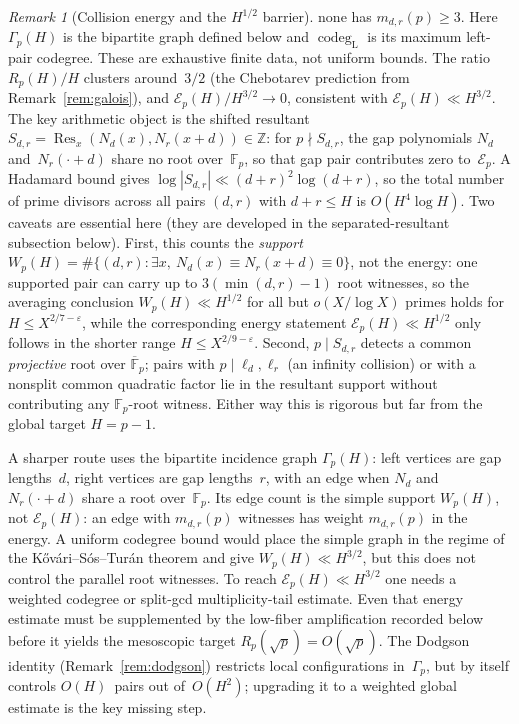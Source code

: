 \documentclass[11pt]{article}
\theoremstyle{definition}
\theoremstyle{remark}
\newtheorem{remark}[theorem]{Remark}
\begin{document}
\begin{remark}[Collision energy and the $H^{1/2}$ barrier]
none has $m_{d,r}(p)\ge3$.  Here $\Gamma_p(H)$ is the bipartite graph
defined below and $\operatorname{codeg}_{\mathrm L}$ is its maximum
left-pair codegree.  These are exhaustive finite data, not uniform
bounds.
The ratio $R_p(H)/H$ clusters around~$3/2$
(the Chebotarev prediction from
Remark~\ref{rem:galois}), and
$\mathcal{E}_p(H)/H^{3/2} \to 0$, consistent with
$\mathcal{E}_p(H) \ll H^{3/2}$.
The key arithmetic object is the shifted resultant
$S_{d,r} = \operatorname{Res}_x(N_d(x), N_r(x+d)) \in \mathbb{Z}$:
for $p \nmid S_{d,r}$, the gap polynomials $N_d$ and~$N_r(\cdot + d)$
share no root over~$\mathbb{F}_p$, so that gap pair
contributes zero to~$\mathcal{E}_p$.
A Hadamard bound gives
$\log |S_{d,r}| \ll (d+r)^2 \log(d+r)$, so the total
number of prime divisors across all pairs $(d,r)$ with
$d+r \le H$ is $O(H^4 \log H)$.
Two caveats are essential here
(they are developed in the separated-resultant
subsection below).
First, this counts the \emph{support}
$W_p(H) = \#\{(d,r) : \exists x,\ N_d(x) \equiv
N_r(x{+}d) \equiv 0\}$, not the energy: one supported
pair can carry up to $3(\min(d,r){-}1)$ root witnesses,
so the averaging conclusion
$W_p(H) \ll H^{1/2}$ for all but $o(X/\log X)$ primes
holds for $H \le X^{2/7-\varepsilon}$, while the
corresponding energy statement
$\mathcal{E}_p(H) \ll H^{1/2}$ only follows in the
shorter range $H \le X^{2/9-\varepsilon}$.
Second, $p \mid S_{d,r}$ detects a common
\emph{projective} root over $\overline{\mathbb F}_p$;
pairs with $p \mid \ell_d, \ell_r$ (an infinity
collision) or with a nonsplit common quadratic factor
lie in the resultant support without contributing any
$\mathbb F_p$-root witness.
Either way this is rigorous but far from
the global target $H = p-1$.

A sharper route uses the bipartite incidence graph
$\Gamma_p(H)$: left vertices are gap lengths~$d$, right
vertices are gap lengths~$r$, with an edge when
$N_d$ and~$N_r(\cdot + d)$ share a root
over~$\mathbb{F}_p$.
Its edge count is the simple support $W_p(H)$, not
$\mathcal E_p(H)$: an edge with $m_{d,r}(p)$ witnesses
has weight $m_{d,r}(p)$ in the energy.  A uniform
codegree bound would place the simple graph in the
regime of the K\H{o}v\'ari--S\'os--Tur\'an theorem and
give $W_p(H)\ll H^{3/2}$, but this does not control the
parallel root witnesses.  To reach
$\mathcal E_p(H)\ll H^{3/2}$ one needs a weighted
codegree or split-gcd multiplicity-tail estimate.  Even
that energy estimate must be supplemented by the
low-fiber amplification recorded below before it yields
the mesoscopic target $R_p(\sqrt p)=O(\sqrt p)$.
The Dodgson identity
(Remark~\ref{rem:dodgson}) restricts local
configurations in~$\Gamma_p$, but by itself controls
$O(H)$~pairs out of~$O(H^2)$; upgrading it to a
weighted global estimate is the key missing step.
\end{remark}
\end{document}
